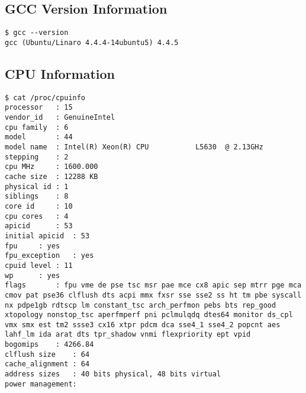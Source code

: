 \documentclass{article}
\begin{document}
\subsection{GCC Version Information}
\begin{lstlisting}
$ gcc --version
gcc (Ubuntu/Linaro 4.4.4-14ubuntu5) 4.4.5
\end{lstlisting}
\subsection{CPU Information}
\begin{lstlisting}
$ cat /proc/cpuinfo
processor	: 15
vendor_id	: GenuineIntel
cpu family	: 6
model		: 44
model name	: Intel(R) Xeon(R) CPU           L5630  @ 2.13GHz
stepping	: 2
cpu MHz		: 1600.000
cache size	: 12288 KB
physical id	: 1
siblings	: 8
core id		: 10
cpu cores	: 4
apicid		: 53
initial apicid	: 53
fpu		: yes
fpu_exception	: yes
cpuid level	: 11
wp		: yes
flags		: fpu vme de pse tsc msr pae mce cx8 apic sep mtrr pge mca cmov pat pse36 clflush dts acpi mmx fxsr sse sse2 ss ht tm pbe syscall nx pdpe1gb rdtscp lm constant_tsc arch_perfmon pebs bts rep_good xtopology nonstop_tsc aperfmperf pni pclmulqdq dtes64 monitor ds_cpl vmx smx est tm2 ssse3 cx16 xtpr pdcm dca sse4_1 sse4_2 popcnt aes lahf_lm ida arat dts tpr_shadow vnmi flexpriority ept vpid
bogomips	: 4266.84
clflush size	: 64
cache_alignment	: 64
address sizes	: 40 bits physical, 48 bits virtual
power management:
\end{lstlisting}
\end{document}
